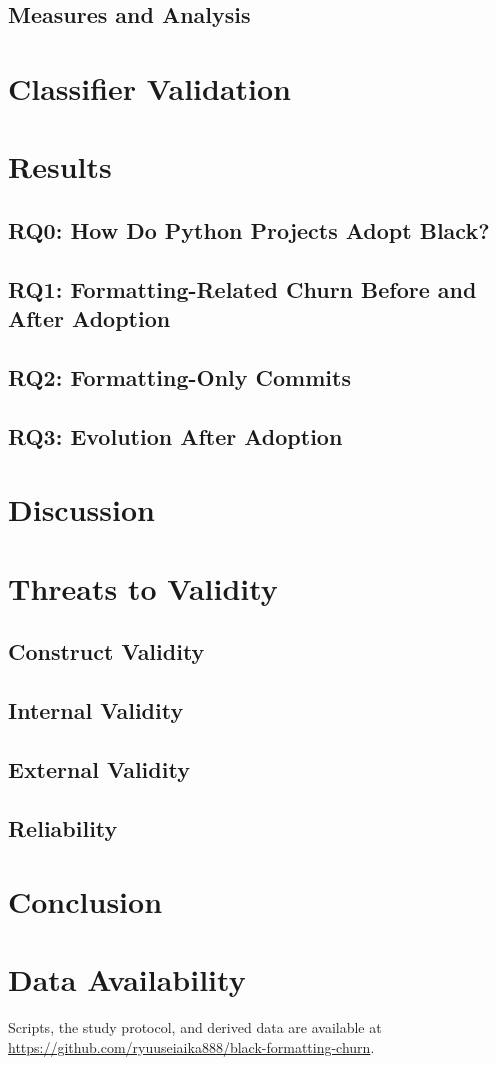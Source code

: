 \documentclass[acmsmall,nonacm,screen]{acmart}
\begin{document}
\subsection{Measures and Analysis}

\section{Classifier Validation}
\label{sec:validation}

\section{Results}
\label{sec:results}
\subsection{RQ0: How Do Python Projects Adopt Black?}
\subsection{RQ1: Formatting-Related Churn Before and After Adoption}
\subsection{RQ2: Formatting-Only Commits}
\subsection{RQ3: Evolution After Adoption}

\section{Discussion}
\label{sec:discussion}

\section{Threats to Validity}
\label{sec:threats}
\subsection{Construct Validity}
\subsection{Internal Validity}
\subsection{External Validity}
\subsection{Reliability}

\section{Conclusion}
\label{sec:conclusion}

\section*{Data Availability}
Scripts, the study protocol, and derived data are available at
\url{https://github.com/ryuuseiaika888/black-formatting-churn}.



\end{document}
